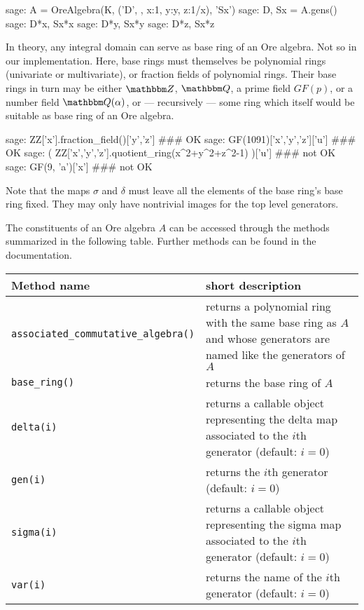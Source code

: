 \documentclass{llncs}
\let\set\mathbbm
\begin{document}
\begin{sageexample}
  sage: A = OreAlgebra(K, ('D', {}, {x:1, y:y, z:1/x}), 'Sx')
  sage: D, Sx = A.gens()
  sage: D*x, Sx*x
  sage: D*y, Sx*y
  sage: D*z, Sx*z
\end{sageexample}

In theory, any integral domain can serve as base ring of an Ore algebra. Not so
in our implementation. Here, base rings must themselves be polynomial rings
(univariate or multivariate), or fraction fields of polynomial rings. Their base
rings in turn may be either $\set Z$, $\set Q$, a prime field $GF(p)$, or a
number field $\set Q(\alpha)$, or --- recursively --- some ring which itself
would be suitable as base ring of an Ore algebra.

\begin{sageexample}
  sage: ZZ['x'].fraction_field()['y','z'] ### OK
  sage: GF(1091)['x','y','z']['u'] ### OK
  sage: ( ZZ['x','y','z'].quotient_ring(x^2+y^2+z^2-1) )['u'] ### not OK
  sage: GF(9, 'a')['x'] ### not OK
\end{sageexample}

Note that the maps $\sigma$ and $\delta$ must leave all the elements of
the base ring's base ring fixed. They may only have nontrivial images for
the top level generators. 

The constituents of an Ore algebra $A$ can be accessed through the methods
summarized in the following table. Further methods can be found in the 
documentation. 

\begin{center}
  \begin{tabular}{|l|p{.5\hsize}|}
    \hline
    Method name & short description \\\hline
    \verb|associated_commutative_algebra()| & returns a polynomial ring with the
       same base ring as $A$ and whose generators are named like the generators
       of~$A$\\
    \verb|base_ring()| & returns the base ring of $A$\\
    \verb|delta(i)| & returns a callable object representing the delta map
       associated to the $i$th generator (default: $i=0$) \\
    \verb|gen(i)| & returns the $i$th generator (default: $i=0$)\\
    \verb|sigma(i)| & returns a callable object representing the sigma map
       associated to the $i$th generator (default: $i=0$) \\
    \verb|var(i)| & returns the name of the $i$th generator (default: $i=0$)\\\hline
  \end{tabular}
\end{center}
\end{document}
